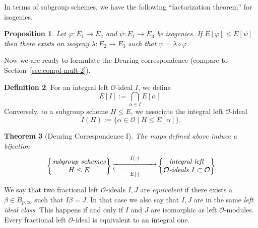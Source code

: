 \documentclass[10pt]{article}
\theoremstyle{plain}
\newtheorem{theorem}{Theorem}
\newtheorem{proposition}[theorem]{Proposition}
\theoremstyle{definition}
\newtheorem{definition}[theorem]{Definition}
\def\O{\ensuremath{\mathcal{O}}}
\begin{document}
In terms of subgroup schemes, we have the following ``factorization theorem''
for isogenies.

\begin{proposition}
Let $\varphi:E_1\to E_2$ and $\psi:E_1\to E_3$ be isogenies.
If $E[\varphi]\leq E[\psi]$ then there exists an isogeny
$\lambda:E_2\to E_3$ such that $\psi = \lambda\circ\varphi$.
\end{proposition}

Now we are ready to formulate the Deuring correspondence (compare to
Section~\ref{sec:compl-mult-2}).

\begin{definition}
For an integral left $\O$-ideal $I$, we define
\begin{equation*}
    E[I] := \bigcap_{\alpha\in I} E[\alpha].
\end{equation*}
Conversely, to a subgroup scheme $H\leq E$,
we associate the integral left $\O$-ideal 
\begin{equation*}
    I(H) := \{\alpha\in\O\mid H\leq E[\alpha]\}.
\end{equation*}
\end{definition}

\begin{theorem}[Deuring Correspondence I]\label{thm:deuring1}
    The maps defined above induce a bijection
    \begin{equation*}
        \left\{
            \begin{tabular}{@{} c @{}}
                \emph{subgroup schemes} \\
                $H\leq E$
            \end{tabular}
        \right\}
        \begin{gathered}
            \overset{I(\cdot)}{\xrightarrow{\hspace*{2cm}}} \\[-2ex]
            \underset{E[\cdot]}{\xleftarrow{\hspace*{2cm}}}
        \end{gathered}
        \left\{
            \begin{tabular}{@{} c @{}}
                \emph{integral left} \\
                $\O$\emph{-ideals} $I\subset \O$
            \end{tabular}
        \right\}
    \end{equation*}
\end{theorem}

We say that two fractional left $\O$-ideals $I,J$ are \emph{equivalent}
if there exists a $\beta\in B_{p,\infty}$ such that $I\beta = J$.
In that case we also say that $I,J$ are in the same \emph{left ideal class}.
This happens if and only if $I$ and $J$ are isomorphic as left $\O$-modules.
Every fractional left $\O$-ideal is equivalent to an integral one.
\end{document}
